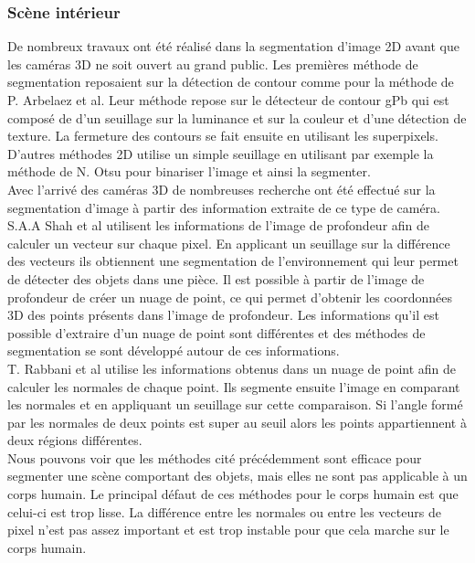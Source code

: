 \subsubsection{Scène intérieur}
De nombreux travaux ont été réalisé dans la segmentation d'image 2D avant que les caméras 3D ne soit
ouvert au grand public. Les premières méthode de segmentation reposaient sur la détection de contour
comme pour la méthode de P. Arbelaez et al\cite{2DSegmentation1}. Leur méthode repose sur le détecteur
de contour gPb qui est composé de d'un seuillage sur la luminance et sur la couleur et d'une détection
de texture. La fermeture des contours se fait ensuite en utilisant les superpixels. D'autres méthodes
2D utilise un simple seuillage en utilisant par exemple la méthode de N. Otsu\cite{Otsu} pour binariser
l'image et ainsi la segmenter.\\

Avec l'arrivé des caméras 3D de nombreuses recherche ont été effectué sur la segmentation d'image à partir
des information extraite de ce type de caméra. S.A.A Shah et al\cite{3DSegmentation1} utilisent les informations
de l'image de profondeur afin de calculer un vecteur sur chaque pixel. En applicant un seuillage sur la différence
des vecteurs ils obtiennent une segmentation de l'environnement qui leur permet de détecter des objets dans une pièce.
Il est possible à partir de l'image de profondeur de créer un nuage de point, ce qui permet d'obtenir les 
coordonnées 3D des points présents dans l'image de profondeur. Les informations qu'il est possible d'extraire
d'un nuage de point sont différentes et des méthodes de segmentation se sont développé autour de ces informations.\\

T. Rabbani et al\cite{pointCloudSegmentation} utilise les informations obtenus dans un nuage de point afin 
de calculer les normales de chaque point. Ils segmente ensuite l'image en comparant les normales et en appliquant
un seuillage sur cette comparaison. Si l'angle formé par les normales de deux points est super au seuil alors
les points appartiennent à deux régions différentes.\\

Nous pouvons voir que les méthodes cité précédemment sont efficace pour segmenter une scène comportant des objets,
mais elles ne sont pas applicable à un corps humain. Le principal défaut de ces méthodes pour le corps humain est 
que celui-ci est trop lisse. La différence entre les normales ou entre les vecteurs de pixel n'est pas assez important
et est trop instable pour que cela marche sur le corps humain.

